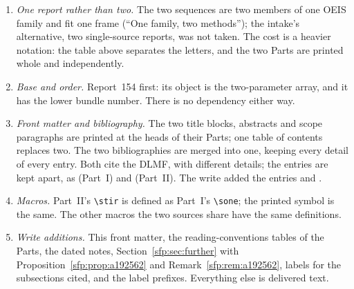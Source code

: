 \documentclass[11pt,letterpaper]{article}
\numberwithin{equation}{section}
\theoremstyle{definition}\newtheorem{definition}[theorem]{Definition}
\theoremstyle{remark}\newtheorem{remark}[theorem]{Remark}
\newcommand{\sone}[2]{\genfrac{[}{]}{0pt}{}{#1}{#2}}
\newcommand{\stir}{\sone}
\begin{document}
\begin{enumerate}
\item \emph{One report rather than two.} The two sequences are two members of one OEIS family and fit one frame (``One family, two methods''); the intake's alternative, two single-source reports, was not taken. The cost is a heavier notation: the table above separates the letters, and the two Parts are printed whole and independently.
\item \emph{Base and order.} Report~154 first: its object is the two-parameter array, and it has the lower bundle number. There is no dependency either way.
\item \emph{Front matter and bibliography.} The two title blocks, abstracts and scope paragraphs are printed at the heads of their Parts; one table of contents replaces two. The two bibliographies are merged into one, keeping every detail of every entry. Both cite the DLMF, with different details; the entries are kept apart, as \cite{dlmf} (Part~I) and \cite{dlmf-mc} (Part~II). The write added the entries \cite{oeisA192562} and \cite{TSvol}.
\item \emph{Macros.} Part~II's \verb!\stir! is defined as Part~I's \verb!\sone!; the printed symbol is the same. The other macros the two sources share have the same definitions.
\item \emph{Write additions.} This front matter, the reading-conventions tables of the Parts, the dated notes, Section~\ref{sfp:sec:further} with Proposition~\ref{sfp:prop:a192562} and Remark~\ref{sfp:rem:a192562}, labels for the subsections cited, and the label prefixes. Everything else is delivered text.
\end{enumerate}
\end{document}
